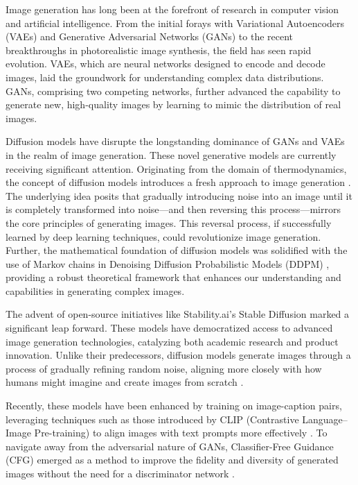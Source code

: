 Image generation has long been at the forefront of research in computer vision and artificial intelligence. From the initial forays with Variational Autoencoders (VAEs) \cite{Kingma2013} and Generative Adversarial Networks (GANs) \cite{Goodfellow2014} to the recent breakthroughs in photorealistic image synthesis, the field has seen rapid evolution. VAEs, which are neural networks designed to encode and decode images, laid the groundwork for understanding complex data distributions. GANs, comprising two competing networks, further advanced the capability to generate new, high-quality images by learning to mimic the distribution of real images.

Diffusion models have disrupte the longstanding dominance of GANs \cite{Goodfellow2014} and VAEs \cite{Kingma2013} in the realm of image generation. These novel generative models are currently receiving significant attention. Originating from the domain of thermodynamics, the concept of diffusion models introduces a fresh approach to image generation \cite{Sohl-Dickstein2015}. The underlying idea posits that gradually introducing noise into an image until it is completely transformed into noise—and then reversing this process—mirrors the core principles of generating images. This reversal process, if successfully learned by deep learning techniques, could revolutionize image generation. Further, the mathematical foundation of diffusion models was solidified with the use of Markov chains in Denoising Diffusion Probabilistic Models (DDPM) \cite{DDPM}, providing a robust theoretical framework that enhances our understanding and capabilities in generating complex images.

The advent of open-source initiatives like Stability.ai's Stable Diffusion marked a significant leap forward. These models have democratized access to advanced image generation technologies, catalyzing both academic research and product innovation. Unlike their predecessors, diffusion models generate images through a process of gradually refining random noise, aligning more closely with how humans might imagine and create images from scratch \cite{LDM}.

Recently, these models have been enhanced by training on image-caption pairs, leveraging techniques such as those introduced by CLIP (Contrastive Language–Image Pre-training) to align images with text prompts more effectively \cite{CLIP}. To navigate away from the adversarial nature of GANs, Classifier-Free Guidance (CFG) emerged as a method to improve the fidelity and diversity of generated images without the need for a discriminator network \cite{CFG}.

